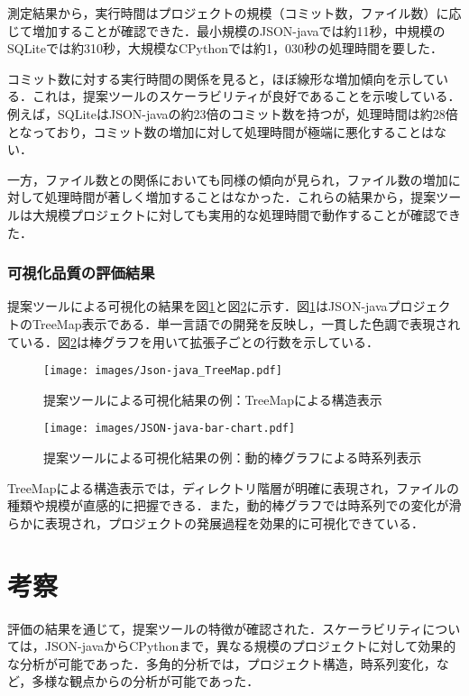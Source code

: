 \documentclass[12pt,twoside]{jbook}
\begin{document}
測定結果から，実行時間はプロジェクトの規模（コミット数，ファイル数）に応じて増加することが確認できた．最小規模のJSON-javaでは約11秒，中規模のSQLiteでは約310秒，大規模なCPythonでは約1，030秒の処理時間を要した．

コミット数に対する実行時間の関係を見ると，ほぼ線形な増加傾向を示している．これは，提案ツールのスケーラビリティが良好であることを示唆している．例えば，SQLiteはJSON-javaの約23倍のコミット数を持つが，処理時間は約28倍となっており，コミット数の増加に対して処理時間が極端に悪化することはない．

一方，ファイル数との関係においても同様の傾向が見られ，ファイル数の増加に対して処理時間が著しく増加することはなかった．これらの結果から，提案ツールは大規模プロジェクトに対しても実用的な処理時間で動作することが確認できた．

\subsection{可視化品質の評価結果}
提案ツールによる可視化の結果を図\ref{fig:treemap-results}と図\ref{fig:barchart-results}に示す．図\ref{fig:treemap-results}はJSON-javaプロジェクトのTreeMap表示である．単一言語での開発を反映し，一貫した色調で表現されている．図\ref{fig:barchart-results}は棒グラフを用いて拡張子ごとの行数を示している．
\begin{figure}[htbp]
  \centering
  \texttt{[image: images/Json-java\_TreeMap.pdf]}
  \caption{提案ツールによる可視化結果の例：TreeMapによる構造表示}
  \label{fig:treemap-results}
\end{figure}

\begin{figure}[htbp]
  \centering
  \texttt{[image: images/JSON-java-bar-chart.pdf]}
  \caption{提案ツールによる可視化結果の例：動的棒グラフによる時系列表示}
  \label{fig:barchart-results}
\end{figure}

TreeMapによる構造表示では，ディレクトリ階層が明確に表現され，ファイルの種類や規模が直感的に把握できる．また，動的棒グラフでは時系列での変化が滑らかに表現され，プロジェクトの発展過程を効果的に可視化できている．

\chapter{考察}
評価の結果を通じて，提案ツールの特徴が確認された．スケーラビリティについては，JSON-javaからCPythonまで，異なる規模のプロジェクトに対して効果的な分析が可能であった．多角的分析では，プロジェクト構造，時系列変化，など，多様な観点からの分析が可能であった．
\end{document}
